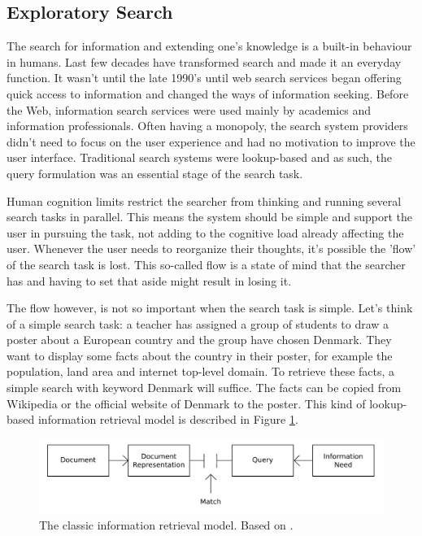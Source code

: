 \subsection{Exploratory Search}
The search for information and extending one's knowledge is a built-in behaviour in humans.
Last few decades have transformed search and made it an everyday function.
It wasn't until the late 1990's until web search services began offering quick access to information and changed the ways of information seeking.
Before the Web, information search services were used mainly by academics and information professionals.
Often having a monopoly, the search system providers didn't need to focus on the user experience and had no motivation to improve the user interface.
Traditional search systems were lookup-based and as such, the query formulation was an essential stage of the search task.

Human cognition limits restrict the searcher from thinking and running several search tasks in parallel.
This means the system should be simple and support the user in pursuing the task, not adding to the cognitive load already affecting the user.
Whenever the user needs to reorganize their thoughts, it's possible the 'flow' of the search task is lost.
This so-called flow is a state of mind that the searcher has and having to set that aside might result in losing it.

The flow however, is not so important when the search task is simple.
Let's think of a simple search task: a teacher has assigned a group of students to draw a poster about a European country and the group have chosen Denmark. They want to display some facts about the country in their poster, for example the population, land area and internet top-level domain. To retrieve these facts, a simple search with keyword Denmark will suffice.
The facts can be copied from Wikipedia or the official website of Denmark to the poster.
This kind of lookup-based information retrieval model is described in Figure \ref{figure_classicIR}.

\begin{figure}[htp] %
\caption{The classic information retrieval model. Based on \protect\cite{bates89}.}
\label{figure_classicIR}
\centering
\includegraphics[scale=0.45]{figures/classicIR.pdf}
\end{figure}

